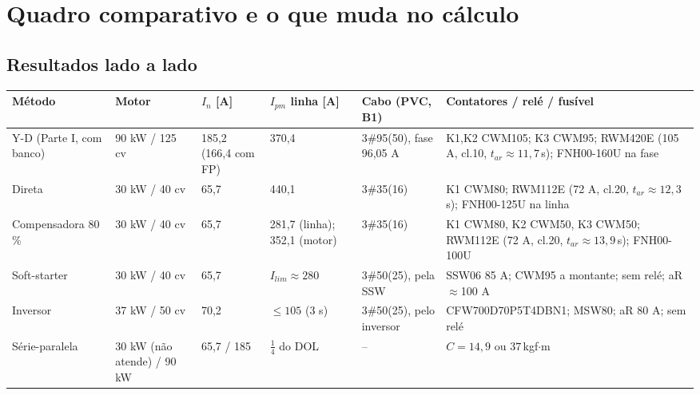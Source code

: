 \documentclass[11pt,a4paper]{article}
\begin{document}
\section{Quadro comparativo e o que muda no c\'alculo}

\subsection{Resultados lado a lado}
\begin{center}
\small
\begin{tabularx}{\linewidth}{@{}>{\raggedright}p{2.6cm}>{\raggedright}p{2.0cm}>{\raggedright}p{1.5cm}>{\raggedright}p{1.7cm}>{\raggedright}p{2.6cm}X@{}}
\toprule
M\'etodo & Motor & $I_n$ [A] & $I_{pm}$ linha [A] & Cabo (PVC, B1) & Contatores / rel\'e / fus\'ivel \\
\midrule
Y-D (Parte I, com banco) & 90 kW / 125 cv & 185,2 (166,4 com FP) & 370,4 & 3\#95(50), fase 96,05 A & K1,K2 CWM105; K3 CWM95; RWM420E (105 A, cl.10, $t_{ar}\approx 11{,}7$\,s); FNH00-160U na fase \\
Direta & 30 kW / 40 cv & 65,7 & 440,1 & 3\#35(16) & K1 CWM80; RWM112E (72 A, cl.20, $t_{ar}\approx 12{,}3$\,s); FNH00-125U na linha \\
Compensadora 80\,\% & 30 kW / 40 cv & 65,7 & 281,7 (linha); 352,1 (motor) & 3\#35(16) & K1 CWM80, K2 CWM50, K3 CWM50; RWM112E (72 A, cl.20, $t_{ar}\approx 13{,}9$\,s); FNH00-100U \\
Soft-starter & 30 kW / 40 cv & 65,7 & $I_{lim}\approx 280$ & 3\#50(25), pela SSW & SSW06 85 A; CWM95 a montante; sem rel\'e; aR $\approx$100 A \\
Inversor & 37 kW / 50 cv & 70,2 & $\le 105$ (3 s) & 3\#50(25), pelo inversor & CFW700D70P5T4DBN1; MSW80; aR 80 A; sem rel\'e \\
S\'erie-paralela & 30 kW (n\~ao atende) / 90 kW & 65,7 / 185 & $\tfrac{1}{4}$ do DOL & -- & $C=14{,}9$ ou $37$\,kgf$\cdot$m \\
\bottomrule
\end{tabularx}
\end{center}
\end{document}
